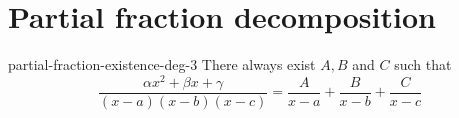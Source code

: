 \documentclass[preview]{standalone}
\begin{document}
\genpage

\section{Partial fraction decomposition}

\begin{snippetproposition}{partial-fraction-existence-deg-3}{}
    There always exist \(A,B\) and \(C\) such that
    \[
        \frac{\alpha x^2 + \beta x + \gamma}{(x-a)(x-b)(x-c)} = \frac{A}{x-a} + \frac{B}{x-b} + \frac{C}{x-c}
    \]
\end{snippetproposition}
\end{document}
